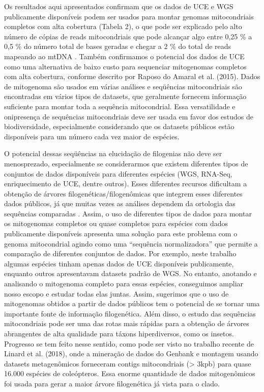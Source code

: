\documentclass[../DISSERTACAO_MAIN.tex]{subfiles}
\begin{document}
	Os resultados aqui apresentados confirmam que os dados de UCE e WGS publicamente disponíveis podem ser usados para montar genomas mitocondriais completos com alta cobertura (Tabela 2), o que pode ser explicado pelo alto número de cópias de reads mitocondriais que pode alcançar algo entre 0,25 \% a 0,5 \% do número total de bases geradas \cite{Prosdocimi2012} e chegar a 2 \% do total de reads mapeando ao mtDNA \cite{Ekblom2014}. Também confirmamos o potencial dos dados de UCE como uma alternativa de baixo custo para sequenciar mitogenomas completos com alta cobertura, conforme descrito por Raposo do Amaral et al. (2015). Dados de mitogenoma são usados em várias análises e seqüências mitocondriais são encontradas em vários tipos de datasets, que geralmente fornecem informação suficiente para montar toda a sequência mitocondrial. Essa versatilidade e onipresença de sequências mitocondriais deve ser usada em favor dos estudos de biodiversidade, especialmente considerando que os datasets públicos estão disponíveis para um número cada vez maior de espécies.
	
	O potencial dessas seqüências na elucidação de filogenias não deve ser menosprezado, especialmente se considerarmos que existem diferentes tipos de conjuntos de dados disponíveis para diferentes espécies (WGS, RNA-Seq, enriquecimento de UCE, dentre outros). Esses diferentes recursos dificultam a obtenção de árvores filogenéticas/filogenômicas que integrem esses diferentes dados públicos, já que muitas vezes as análises dependem da ortologia das sequências comparadas \cite{Kuzniar2008}. Assim, o uso de diferentes tipos de dados para montar os mitogenomas completos ou quase completos para espécies com dados publicamente disponíveis apresenta uma solução para este problema com o genoma mitocondrial agindo como uma “sequência normalizadora” que permite a comparação de diferentes conjuntos de dados. Por exemplo, neste trabalho algumas espécies tinham apenas dados de UCE disponíveis publicamente, enquanto outros apresentavam datasets padrão de WGS. No entanto, anotando e analisando o mitogenoma completo para essas espécies, conseguimos ampliar nosso escopo e estudar todas elas juntas. Assim, sugerimos que o uso de mitogenomas obtidos a partir de dados públicos tem o potencial de se tornar uma importante fonte de informação filogenética. Além disso, o estudo das sequências mitocondriais pode ser uma das rotas mais rápidas para a obtenção de árvores abrangentes de alta qualidade para táxons hiperdiversos, como os insetos. Progresso se tem feito nesse sentido, como pode ser visto no trabalho recente de Linard et al. (2018), onde a mineração de dados do Genbank e montagem usando datasets metagenômicos forneceram contigs mitocondriais (> 3kpb) para quase 16.000 espécies de coleópteros. Essa enorme quantidade de dados mitogenômicos foi usada para gerar a maior árvore filogenética já vista para o clado.
	
\end{document}
